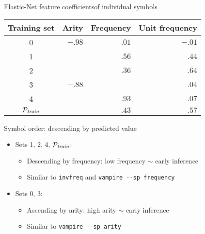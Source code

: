 \documentclass{beamer}
\begin{document}
\begin{frame}[noframenumbering]{Elastic-Net feature coefficients}{of individual symbols}

\begin{table}
	\begin{tabular}{c|rrr}
		Training set & Arity & Frequency & Unit frequency \\
		\hline
		0 & $-.98$ & $ .01$ & $-.01$ \\
		1 &        & $ .56$ & $ .44$ \\
		2 &        & $ .36$ & $ .64$ \\
		3 & $-.88$ &        & $ .04$ \\
		4 &        & $ .93$ & $ .07$ \\
		\hline
		\(\mathcal{P}_{\mathit{train}}\) &        & $ .43$ & $ .57$ \\
	\end{tabular}
\end{table}

Symbol order: descending by predicted value

\begin{itemize}
	\item Sets 1, 2, 4, $\mathcal{P}_{\mathit{train}}$:
	\begin{itemize}
		\item Descending by frequency: low frequency $\sim$ early inference
		\item Similar to \texttt{invfreq} and \texttt{vampire \--\--sp frequency}
	\end{itemize}
	\item Sets 0, 3:
	\begin{itemize}
		\item Ascending by arity: high arity $\sim$ early inference
		\item Similar to \texttt{vampire \--\--sp arity}
	\end{itemize}
\end{itemize}

\end{frame}
\end{document}
